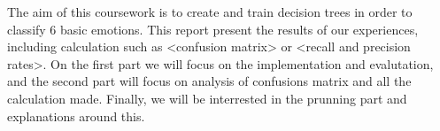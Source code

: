 The aim of this coursework is to create and train decision trees in order to classify 6 basic emotions. This report present the results of our experiences, including calculation such as <confusion matrix> or <recall and precision rates>. 
On the first part we will focus on the implementation and evalutation, and the second part will focus on analysis of confusions matrix and all the calculation made. 
Finally, we will be interrested in the prunning part and explanations around this. 
